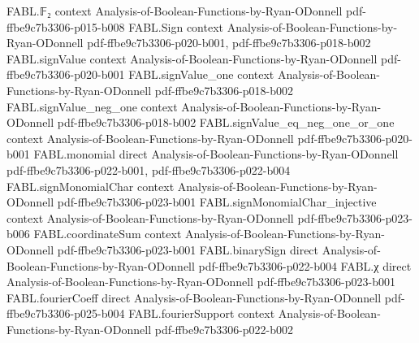 \begin{theorem}
\label{FABL.scheduledFourierCoeffEstimatorProgram_failureProbability_le}
\leanok
{}
\proofstep
  {FABL.𝔽₂}
  {context}
  {Analysis-of-Boolean-Functions-by-Ryan-ODonnell}
  {pdf-ffbe9c7b3306-p015-b008}
\proofstep
  {FABL.Sign}
  {context}
  {Analysis-of-Boolean-Functions-by-Ryan-ODonnell}
  {pdf-ffbe9c7b3306-p020-b001,
    pdf-ffbe9c7b3306-p018-b002}
\proofstep
  {FABL.signValue}
  {context}
  {Analysis-of-Boolean-Functions-by-Ryan-ODonnell}
  {pdf-ffbe9c7b3306-p020-b001}
\proofstep
  {FABL.signValue_one}
  {context}
  {Analysis-of-Boolean-Functions-by-Ryan-ODonnell}
  {pdf-ffbe9c7b3306-p018-b002}
\proofstep
  {FABL.signValue_neg_one}
  {context}
  {Analysis-of-Boolean-Functions-by-Ryan-ODonnell}
  {pdf-ffbe9c7b3306-p018-b002}
\proofstep
  {FABL.signValue_eq_neg_one_or_one}
  {context}
  {Analysis-of-Boolean-Functions-by-Ryan-ODonnell}
  {pdf-ffbe9c7b3306-p020-b001}
\proofstep
  {FABL.monomial}
  {direct}
  {Analysis-of-Boolean-Functions-by-Ryan-ODonnell}
  {pdf-ffbe9c7b3306-p022-b001,
    pdf-ffbe9c7b3306-p022-b004}
\proofstep
  {FABL.signMonomialChar}
  {context}
  {Analysis-of-Boolean-Functions-by-Ryan-ODonnell}
  {pdf-ffbe9c7b3306-p023-b001}
\proofstep
  {FABL.signMonomialChar_injective}
  {context}
  {Analysis-of-Boolean-Functions-by-Ryan-ODonnell}
  {pdf-ffbe9c7b3306-p023-b006}
\proofstep
  {FABL.coordinateSum}
  {context}
  {Analysis-of-Boolean-Functions-by-Ryan-ODonnell}
  {pdf-ffbe9c7b3306-p023-b001}
\proofstep
  {FABL.binarySign}
  {direct}
  {Analysis-of-Boolean-Functions-by-Ryan-ODonnell}
  {pdf-ffbe9c7b3306-p022-b004}
\proofstep
  {FABL.χ}
  {direct}
  {Analysis-of-Boolean-Functions-by-Ryan-ODonnell}
  {pdf-ffbe9c7b3306-p023-b001}
\proofstep
  {FABL.fourierCoeff}
  {direct}
  {Analysis-of-Boolean-Functions-by-Ryan-ODonnell}
  {pdf-ffbe9c7b3306-p025-b004}
\proofstep
  {FABL.fourierSupport}
  {context}
  {Analysis-of-Boolean-Functions-by-Ryan-ODonnell}
  {pdf-ffbe9c7b3306-p022-b002}

\end{theorem}
